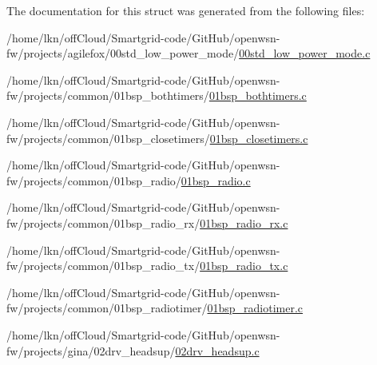 The documentation for this struct was generated from the following files\+:\begin{DoxyCompactItemize}
\item 
/home/lkn/off\+Cloud/\+Smartgrid-\/code/\+Git\+Hub/openwsn-\/fw/projects/agilefox/00std\+\_\+low\+\_\+power\+\_\+mode/\hyperlink{agilefox_200std__low__power__mode_200std__low__power__mode_8c}{00std\+\_\+low\+\_\+power\+\_\+mode.\+c}\item 
/home/lkn/off\+Cloud/\+Smartgrid-\/code/\+Git\+Hub/openwsn-\/fw/projects/common/01bsp\+\_\+bothtimers/\hyperlink{01bsp__bothtimers_8c}{01bsp\+\_\+bothtimers.\+c}\item 
/home/lkn/off\+Cloud/\+Smartgrid-\/code/\+Git\+Hub/openwsn-\/fw/projects/common/01bsp\+\_\+closetimers/\hyperlink{01bsp__closetimers_8c}{01bsp\+\_\+closetimers.\+c}\item 
/home/lkn/off\+Cloud/\+Smartgrid-\/code/\+Git\+Hub/openwsn-\/fw/projects/common/01bsp\+\_\+radio/\hyperlink{01bsp__radio_8c}{01bsp\+\_\+radio.\+c}\item 
/home/lkn/off\+Cloud/\+Smartgrid-\/code/\+Git\+Hub/openwsn-\/fw/projects/common/01bsp\+\_\+radio\+\_\+rx/\hyperlink{01bsp__radio__rx_8c}{01bsp\+\_\+radio\+\_\+rx.\+c}\item 
/home/lkn/off\+Cloud/\+Smartgrid-\/code/\+Git\+Hub/openwsn-\/fw/projects/common/01bsp\+\_\+radio\+\_\+tx/\hyperlink{01bsp__radio__tx_8c}{01bsp\+\_\+radio\+\_\+tx.\+c}\item 
/home/lkn/off\+Cloud/\+Smartgrid-\/code/\+Git\+Hub/openwsn-\/fw/projects/common/01bsp\+\_\+radiotimer/\hyperlink{01bsp__radiotimer_8c}{01bsp\+\_\+radiotimer.\+c}\item 
/home/lkn/off\+Cloud/\+Smartgrid-\/code/\+Git\+Hub/openwsn-\/fw/projects/gina/02drv\+\_\+headsup/\hyperlink{02drv__headsup_8c}{02drv\+\_\+headsup.\+c}\end{DoxyCompactItemize}
